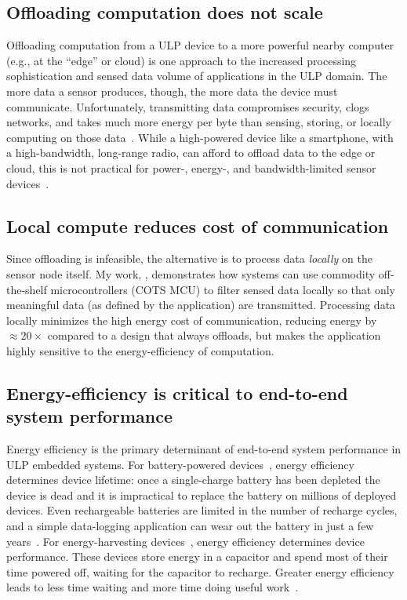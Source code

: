 \subsection{Offloading computation does not scale}
Offloading computation from a ULP device to a more powerful nearby computer (e.g., at the ``edge'' or cloud) is one approach to the increased processing sophistication and sensed data volume of applications in the ULP domain.
%
The more data a sensor produces, though, the more data the device must
communicate.
%
Unfortunately, transmitting data compromises security, clogs networks, and takes much more energy per byte than
sensing, storing, or locally computing on those data~\cite{sonic,zebranet}.  
%
While a high-powered device like a smartphone, with a high-bandwidth,
long-range radio, can afford to offload data to the edge or cloud,
this is not practical for power-, energy-, and bandwidth-limited sensor devices~\cite{dongare2017openchirp,sonic}.

\subsection{Local compute reduces cost of communication}
Since offloading is infeasible,
the alternative is to process data \emph{locally} on the sensor node itself.
% 
My work, \sonic, demonstrates how systems can use commodity off-the-shelf microcontrollers (COTS MCU) to filter sensed data locally so that only meaningful data (as defined by the application) are transmitted.
% 
Processing data locally minimizes the high energy cost of communication, reducing energy by $\approx20\times$ compared to a design that always offloads, but makes the application highly sensitive to the energy-efficiency of computation.

\subsection{Energy-efficiency is critical to end-to-end system performance}
Energy efficiency is the primary determinant of end-to-end system performance in ULP embedded systems.
% 
For battery-powered devices~\cite{culler2002mica,rowe2011sensor}, energy efficiency determines device lifetime: once a single-charge battery has been depleted the device is dead and it is impractical to replace the battery on millions of deployed devices.
% 
Even rechargeable batteries are limited in the number of recharge cycles, and a simple data-logging application can wear out the battery in just a few years~\cite{jackson_2019,nardello2019camaroptera}.
% 
For energy-harvesting devices~\cite{colin2018reconfigurable,hester2015tragedy,flicker,moo,windware}, energy efficiency determines device performance.
% 
These devices store energy in a capacitor and spend most of their time powered off, waiting for the capacitor to recharge.
% 
Greater energy efficiency leads to less time waiting and more time doing useful work~\cite{desai2020power}.

